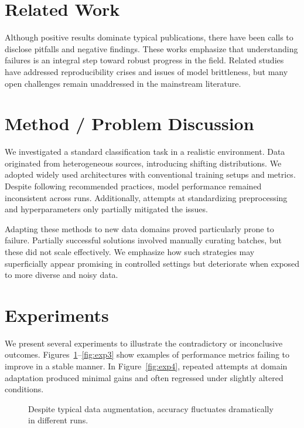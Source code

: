\section{Related Work}
Although positive results dominate typical publications, there have been calls to disclose pitfalls and negative findings. These works emphasize that understanding failures is an integral step toward robust progress in the field. Related studies have addressed reproducibility crises and issues of model brittleness, but many open challenges remain unaddressed in the mainstream literature.

\section{Method / Problem Discussion}
We investigated a standard classification task in a realistic environment. Data originated from heterogeneous sources, introducing shifting distributions. We adopted widely used architectures with conventional training setups and metrics. Despite following recommended practices, model performance remained inconsistent across runs. Additionally, attempts at standardizing preprocessing and hyperparameters only partially mitigated the issues.

Adapting these methods to new data domains proved particularly prone to failure. Partially successful solutions involved manually curating batches, but these did not scale effectively. We emphasize how such strategies may superficially appear promising in controlled settings but deteriorate when exposed to more diverse and noisy data.

\section{Experiments}
We present several experiments to illustrate the contradictory or inconclusive outcomes. Figures~\ref{fig:exp1}--\ref{fig:exp3} show examples of performance metrics failing to improve in a stable manner. In Figure~\ref{fig:exp4}, repeated attempts at domain adaptation produced minimal gains and often regressed under slightly altered conditions.

\begin{figure}[t]
    \centering
    \caption{Despite typical data augmentation, accuracy fluctuates dramatically in different runs.}
    \label{fig:exp1}
\end{figure}

